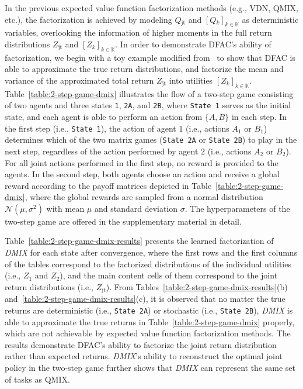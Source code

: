 \documentclass{article}
\newcommand{\agentspace}{\mathbb{K}}
\newcommand{\agentcounter}{k}
\newcommand{\utilityexp}{Q}
\newcommand{\utility}{Z}
\newcommand{\joint}{\mathrm{jt}}
\newcommand{\dmix}{\textit{DMIX}}
\newcounter{example}
\begin{document}
In the previous expected value function factorization methods (e.g., VDN, QMIX, etc.), the factorization is achieved by modeling $\utilityexp{}_{\joint{}}$ and $[\utilityexp{}_{\agentcounter{}}]_{\agentcounter{}\in\agentspace{}}$ as deterministic variables, overlooking the information of higher moments in the full return distributions $\utility{}_{\joint{}}$ and $[\utility{}_{\agentcounter{}}]_{\agentcounter{}\in\agentspace{}}$.
In order to demonstrate DFAC's ability of factorization, we begin with a toy example modified from~\cite{Rashid2018QMIX} to show that DFAC is able to approximate the true return distributions, and factorize the mean and variance of the approximated total return $\utility{}_{\joint{}}$ into utilities $[\utility{}_{\agentcounter{}}]_{\agentcounter{}\in\agentspace{}}$.
Table~\ref{table:2-step-game-dmix} illustrates the flow of a two-step game consisting of two agents and three states \texttt{1}, \texttt{2A}, and \texttt{2B}, where \texttt{State~1} serves as the initial state, and each agent is able to perform an action from $\{A, B\}$ in each step. In the first step (i.e., \texttt{State 1}), the action of agent $1$ (i.e., actions $A_1$ or $B_1$) determines which of the two matrix games (\texttt{State 2A} or \texttt{State 2B}) to play in the next step, regardless of the action performed by agent $2$ (i.e., actions $A_2$ or $B_2$). For all joint actions performed in the first step, no reward is provided to the agents.
In the second step, both agents choose an action and receive a global reward according to the payoff matrices depicted in Table~\ref{table:2-step-game-dmix}, where the global rewards are sampled from a normal distribution $\mathcal{N}(\mu,\sigma^2)$ with mean $\mu$ and standard deviation $\sigma$. The hyperparameters of the two-step game are offered in the supplementary material in detail.

Table~\ref{table:2-step-game-dmix-results} presents the learned factorization of \dmix{} for each state after convergence, where the first rows and the first columns of the tables correspond to the factorized distributions of the individual utilities (i.e., $\utility_1$ and $\utility_2$), and the main content cells of them correspond to the joint return distributions (i.e., $\utility_{\joint}$). 
From Tables~\ref{table:2-step-game-dmix-results}(b) and~\ref{table:2-step-game-dmix-results}(c), it is observed that no matter the true returns are deterministic (i.e., \texttt{State 2A}) or stochastic (i.e., \texttt{State 2B}), \dmix{} is able to approximate the true returns in Table~\ref{table:2-step-game-dmix} properly, which are not achievable by expected value function factorization methods. The results demonstrate DFAC's ability to factorize the joint return distribution rather than expected returns. \dmix{}'s ability to reconstruct the optimal joint policy in the two-step game further shows that \dmix{} can represent the same set of tasks as QMIX.
\end{document}
